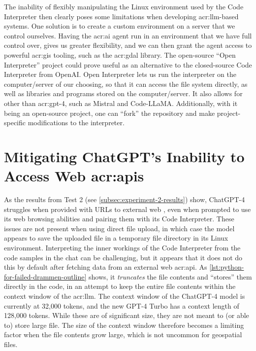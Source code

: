 The inability of flexibly manipulating the Linux environment used by the Code Interpreter then clearly poses some limitations when developing \acrshort{acr:llm}-based systems. One solution is to create a custom environment on a server that we control ourselves. Having the \acrshort{acr:ai} agent run in an environment that we have full control over, gives us greater flexibility, and we can then grant the agent access to powerful \acrshort{acr:gis} tooling, such as the \acrshort{acr:gdal} library. The open-source \enquote{Open Interpreter} project \citep{killianlucasKillianLucasOpeninterpreter2023} could prove useful as an alternative to the closed-source Code Interpreter from OpenAI. Open Interpreter lets us run the interpreter on the computer/server of our choosing, so that it can access the file system directly, as well as libraries and programs stored on the computer/server. It also allows for other  than \acrshort{acr:gpt}-4, such as Mistral  and Code-LLaMA. Additionally, with it being an open-source project, one can \enquote{fork} the repository and make project-specific modifications to the interpreter.

\section[Mitigating ChatGPT's Inability to Access Web APIs]{Mitigating ChatGPT's Inability to Access Web \acrshort{acr:api}s}\label{sec:api-access-discussion}

As the results from Test 2 (see \autoref{subsec:experiment-2-results}) show, ChatGPT-4 struggles when provided with URLs to external web , even when prompted to use its web browsing abilities and pairing them with its Code Interpreter. These issues are not present when using direct file upload, in which case the model appears to save the uploaded file in a temporary file directory in its Linux environment. Interpreting the inner workings of the Code Interpreter from the code samples in the chat can be challenging, but it appears that it does not do this by default after fetching data from an external web \acrshort{acr:api}. As \autoref{lst:python-for-failed-drammen-outline} shows, it \textit{truncates} the file contents and \enquote{stores} them directly in the code, in an attempt to keep the entire file contents within the context window of the \acrshort{acr:llm}. The context window of the ChatGPT-4 model is currently at 32,000 tokens, and the new GPT-4 Turbo has a context length of 128,000 tokens. While these are of significant size, they are not meant to (or able to) store large file. The size of the context window therefore becomes a limiting factor when the file contents grow large, which is not uncommon for geospatial files.

